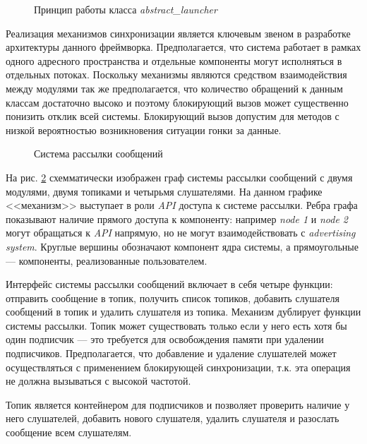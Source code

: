 \begin{figure}[h]
    \caption{Принцип работы класса \textit{abstract\_launcher}}
    \label{im:2_2_2_sequence_diag}
\end{figure}

Реализация механизмов синхронизации является ключевым звеном в разработке архитектуры данного фреймворка. Предполагается, что система работает в рамках одного адресного пространства и отдельные компоненты могут исполняться в отдельных потоках. Поскольку механизмы являются средством взаимодействия между модулями так же предполагается, что количество обращений к данным классам достаточно высоко и поэтому блокирующий вызов может существенно понизить отклик всей системы. Блокирующий вызов допустим для методов с низкой вероятностью возникновения ситуации гонки за данные.

\begin{figure}[h]
    \caption{Система рассылки сообщений}
    \label{im:2_2_3_topic}
\end{figure}

На рис. \ref{im:2_2_3_topic} схемматически изображен граф системы рассылки сообщений с двумя модулями, двумя топиками и четырьмя слушателями. На данном графике <<механизм>> выступает в роли \textit{API} доступа к системе рассылки. Ребра графа показывают наличие прямого доступа к компоненту: например \textit{node 1} и \textit{node 2} могут обращаться к \textit{API} напрямую, но не могут взаимодействовать с \textit{advertising system}. Круглые вершины обозначают компонент ядра системы, а прямоугольные --- компоненты, реализованные пользователем.

Интерфейс системы рассылки сообщений включает в себя четыре функции: отправить сообщение в топик, получить список топиков, добавить слушателя сообщений в топик и удалить слушателя из топика. Механизм дублирует функции системы рассылки. Топик может существовать только если у него есть хотя бы один подписчик --- это требуется для освобождения памяти при удалении подписчиков. Предполагается, что добавление и удаление слушателей может осуществляться с применением блокирующей синхронизации, т.к. эта операция не должна вызываться с высокой частотой.

Топик является контейнером для подписчиков и позволяет проверить наличие у него слушателей, добавить нового слушателя, удалить слушателя и разослать сообщение всем слушателям.


